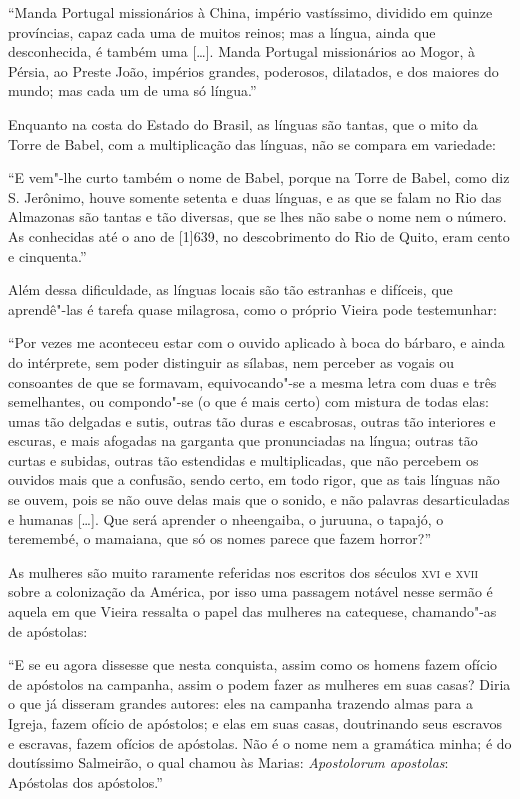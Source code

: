``Manda Portugal missionários à China, império vastíssimo, dividido em
quinze províncias, capaz cada uma de muitos reinos; mas a língua, ainda
que desconhecida, é também uma {[}\ldots{}{]}. Manda Portugal missionários ao
Mogor, à Pérsia, ao Preste João, impérios grandes, poderosos, dilatados,
e dos maiores do mundo; mas cada um de uma só língua.''

Enquanto na costa do Estado do Brasil, as línguas são tantas, que o mito
da Torre de Babel, com a multiplicação das línguas, não se compara em
variedade:

``E vem"-lhe curto também o nome de Babel, porque na Torre de Babel, como
diz S. Jerônimo, houve somente setenta e duas línguas, e as que se falam
no Rio das Almazonas são tantas e tão diversas, que se lhes não sabe o
nome nem o número. As conhecidas até o ano de {[}1{]}639, no
descobrimento do Rio de Quito, eram cento e cinquenta.''

Além dessa dificuldade, as línguas locais são tão estranhas e difíceis,
que aprendê"-las é tarefa quase milagrosa, como o próprio Vieira pode
testemunhar:

``Por vezes me aconteceu estar com o ouvido aplicado à boca do bárbaro,
e ainda do intérprete, sem poder distinguir as sílabas, nem perceber as
vogais ou consoantes de que se formavam, equivocando"-se a mesma letra
com duas e três semelhantes, ou compondo"-se (o que é mais certo) com
mistura de todas elas: umas tão delgadas e sutis, outras tão duras e
escabrosas, outras tão interiores e escuras, e mais afogadas na garganta
que pronunciadas na língua; outras tão curtas e subidas, outras tão
estendidas e multiplicadas, que não percebem os ouvidos mais que a
confusão, sendo certo, em todo rigor, que as tais línguas não se ouvem,
pois se não ouve delas mais que o sonido, e não palavras desarticuladas
e humanas {[}\ldots{}{]}. Que será aprender o nheengaiba, o juruuna, o
tapajó, o teremembé, o mamaiana, que só os nomes parece que fazem
horror?''

As mulheres são muito raramente referidas nos escritos dos séculos \textsc{xvi} e
\textsc{xvii} sobre a colonização da América, por isso uma passagem notável nesse
sermão é aquela em que Vieira ressalta o papel das mulheres na
catequese, chamando"-as de apóstolas:

``E se eu agora dissesse que nesta conquista, assim como os homens fazem
ofício de apóstolos na campanha, assim o podem fazer as mulheres em suas
casas? Diria o que já disseram grandes autores: eles na campanha
trazendo almas para a Igreja, fazem ofício de apóstolos; e elas em suas
casas, doutrinando seus escravos e escravas, fazem ofícios de apóstolas.
Não é o nome nem a gramática minha; é do doutíssimo Salmeirão, o qual
chamou às Marias: \emph{Apostolorum apostolas}: Apóstolas dos
apóstolos.''

